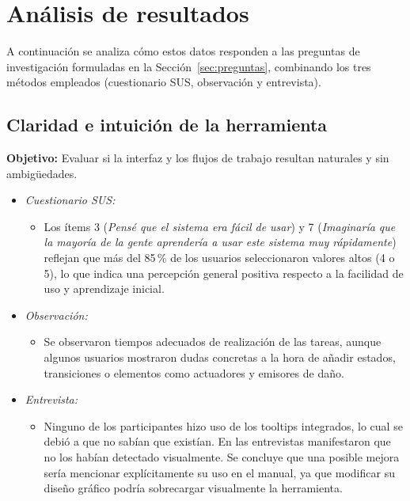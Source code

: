 \section{Análisis de resultados}

A continuación se analiza cómo estos datos responden a las preguntas de investigación formuladas en la Sección~\ref{sec:preguntas}, combinando los tres métodos empleados (cuestionario SUS, observación y entrevista).

\subsection{Claridad e intuición de la herramienta}

\textbf{Objetivo:} Evaluar si la interfaz y los flujos de trabajo resultan naturales y sin ambigüedades.

\begin{itemize}
  \item \emph{Cuestionario SUS:}  
    \begin{itemize}
      \item Los ítems 3 (\textit{Pensé que el sistema era fácil de usar}) y 7 (\textit{Imaginaría que la mayoría de la gente aprendería a usar este sistema muy rápidamente}) reflejan que más del 85\,\% de los usuarios seleccionaron valores altos (4 o 5), lo que indica una percepción general positiva respecto a la facilidad de uso y aprendizaje inicial.
    \end{itemize}
  
  \item \emph{Observación:}  
    \begin{itemize}
      \item Se observaron tiempos adecuados de realización de las tareas, aunque algunos usuarios mostraron dudas concretas a la hora de añadir estados, transiciones o elementos como actuadores y emisores de daño.
    \end{itemize}
  
  \item \emph{Entrevista:}  
    \begin{itemize}
      \item Ninguno de los participantes hizo uso de los tooltips integrados, lo cual se debió a que no sabían que existían. En las entrevistas manifestaron que no los habían detectado visualmente. Se concluye que una posible mejora sería mencionar explícitamente su uso en el manual, ya que modificar su diseño gráfico podría sobrecargar visualmente la herramienta.
    \end{itemize}
\end{itemize}
